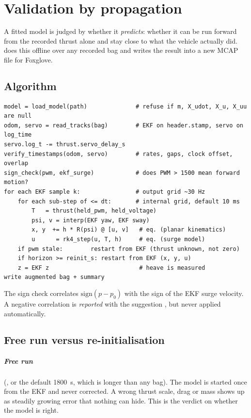 \chapter{Validation by propagation}
\label{ch:validation}

A fitted model is judged by whether it \emph{predicts}: whether it can be run forward from the recorded thrust
alone and stay close to what the vehicle actually did. 
does this offline over any recorded bag and writes the result into a new MCAP file for
Foxglove.

\section{Algorithm}

\begin{lstlisting}[caption={Outline of \code{propagate_model.main()} and \code{propagate()}.},label={lst:propagate}]
model = load_model(path)              # refuse if m, X_udot, X_u, X_uu are null
odom, servo = read_tracks(bag)        # EKF on header.stamp, servo on log_time
servo.log_t -= thrust.servo_delay_s
verify_timestamps(odom, servo)        # rates, gaps, clock offset, overlap
sign_check(pwm, ekf_surge)            # does PWM > 1500 mean forward motion?
for each EKF sample k:                # output grid ~30 Hz
    for each sub-step of <= dt:       # internal grid, default 10 ms
        T   = thrust(held_pwm, held_voltage)
        psi, v = interp(EKF yaw, EKF sway)
        x, y  += h * R(psi) @ [u, v]   # eq. (planar kinematics)
        u      = rk4_step(u, T, h)     # eq. (surge model)
    if pwm stale:        restart from EKF (thrust unknown, not zero)
    if horizon >= reinit_s: restart from EKF (x, y, u)
    z = EKF z                          # heave is measured
write augmented bag + summary
\end{lstlisting}

The sign check correlates $\mathrm{sign}(p - p_0)$ with the sign of the EKF surge velocity. A
negative correlation is \emph{reported} with the suggestion , but never
applied automatically.

\section{Free run versus re-initialisation}

\paragraph{Free run} (, or the default \qty{1800}{\second}, which is longer than any bag).
The model is started once from the EKF and never corrected. A wrong thrust scale, drag or
mass shows up as steadily growing error that nothing can hide. This is the verdict on whether
the model is right.


